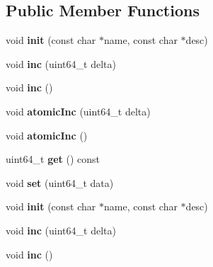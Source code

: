 \subsection*{Public Member Functions}
\begin{DoxyCompactItemize}
\item 
\hypertarget{classCounter_af4d8fe24c5d69c0a90053952947a0784}{void {\bfseries init} (const char $\ast$name, const char $\ast$desc)}\label{classCounter_af4d8fe24c5d69c0a90053952947a0784}

\item 
\hypertarget{classCounter_a3d22d44790be17cb3819593dbdd61982}{void {\bfseries inc} (uint64\-\_\-t delta)}\label{classCounter_a3d22d44790be17cb3819593dbdd61982}

\item 
\hypertarget{classCounter_a936f247406df26f76e06aed14fab9713}{void {\bfseries inc} ()}\label{classCounter_a936f247406df26f76e06aed14fab9713}

\item 
\hypertarget{classCounter_ac5e80a29c4063ab0faef1c25d31f48ed}{void {\bfseries atomic\-Inc} (uint64\-\_\-t delta)}\label{classCounter_ac5e80a29c4063ab0faef1c25d31f48ed}

\item 
\hypertarget{classCounter_a937c25ffb0c2049d293cb480ce5aa155}{void {\bfseries atomic\-Inc} ()}\label{classCounter_a937c25ffb0c2049d293cb480ce5aa155}

\item 
\hypertarget{classCounter_a7af39c45db59374d9fb96cdebae210bc}{uint64\-\_\-t {\bfseries get} () const }\label{classCounter_a7af39c45db59374d9fb96cdebae210bc}

\item 
\hypertarget{classCounter_afeff3d9b8fa53c0bd7ea8b36363a478a}{void {\bfseries set} (uint64\-\_\-t data)}\label{classCounter_afeff3d9b8fa53c0bd7ea8b36363a478a}

\item 
\hypertarget{classCounter_af4d8fe24c5d69c0a90053952947a0784}{void {\bfseries init} (const char $\ast$name, const char $\ast$desc)}\label{classCounter_af4d8fe24c5d69c0a90053952947a0784}

\item 
\hypertarget{classCounter_a3d22d44790be17cb3819593dbdd61982}{void {\bfseries inc} (uint64\-\_\-t delta)}\label{classCounter_a3d22d44790be17cb3819593dbdd61982}

\item 
\hypertarget{classCounter_a936f247406df26f76e06aed14fab9713}{void {\bfseries inc} ()}\label{classCounter_a936f247406df26f76e06aed14fab9713}


\end{DoxyCompactItemize}
